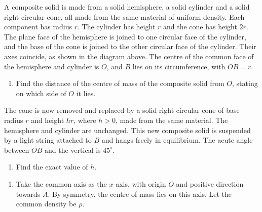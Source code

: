 \documentclass[leqno]{article}
\begin{document}
\begin{enumerate}[
  label=\textbf{\arabic*.},
  leftmargin=*,
  topsep=0pt,
  partopsep=0pt,
  parsep=0pt
]
A composite solid is made from a solid hemisphere, a solid cylinder and a solid right circular cone, all made from the same material of uniform density. Each component has radius $r$. The cylinder has height $r$ and the cone has height $2r$. \\

The plane face of the hemisphere is joined to one circular face of the cylinder, and the base of the cone is joined to the other circular face of the cylinder. Their axes coincide, as shown in the diagram above. The centre of the common face of the hemisphere and cylinder is $O$, and $B$ lies on its circumference, with $OB=r$. \\
\begin{enumerate}[label=\textbf{(\alph*)}]
\item Find the distance of the centre of mass of the composite solid from $O$, stating on which side of $O$ it lies.  \\
\end{enumerate}
The cone is now removed and replaced by a solid right circular cone of base radius $r$ and height $hr$, where $h>0$, made from the same material. The hemisphere and cylinder are unchanged. This new composite solid is suspended by a light string attached to $B$ and hangs freely in equilibrium. The acute angle between $OB$ and the vertical is $45^\circ$. \\
\begin{enumerate}[label=\textbf{(\alph*)}, resume]
\item Find the exact value of $h$.  \\
\end{enumerate}

\vspace*{10pt}

\begin{djsSolution}
\begin{enumerate}[label=\textbf{(\alph*)}, start=1]
\item
Take the common axis as the \(x\)-axis, with origin \(O\) and positive direction towards \(A\). By symmetry, the centre of mass lies on this axis. Let the common density be \(\rho\).


\end{enumerate}
\end{djsSolution}
\end{enumerate}
\end{document}
